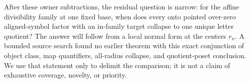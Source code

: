 

After these owner subtractions, the residual question is narrow:
for the affine divisibility family at one fixed base, when does every onto
pointed over-zero aligned-symbol factor with an in-family target collapse
to one unique letter quotient?  The answer will follow from a local normal
form at the centers $r_n$.  A bounded source search found no earlier theorem
with this exact conjunction of object class, map quantifiers, all-radius
collapse, and quotient-poset conclusion.  We use that statement only to
delimit the comparison; it is not a claim of exhaustive coverage, novelty,
or priority.
